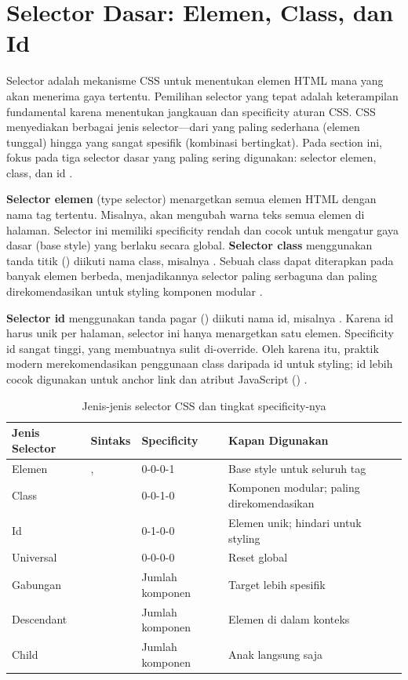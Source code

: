 \section{Selector Dasar: Elemen, Class, dan Id}

Selector adalah mekanisme CSS untuk menentukan elemen HTML mana yang akan menerima gaya tertentu. Pemilihan selector yang tepat adalah keterampilan fundamental karena menentukan jangkauan dan specificity aturan CSS. CSS menyediakan berbagai jenis selector---dari yang paling sederhana (elemen tunggal) hingga yang sangat spesifik (kombinasi bertingkat). Pada section ini, fokus pada tiga selector dasar yang paling sering digunakan: selector elemen, class, dan id \cite{mdnCss}.

\textbf{Selector elemen} (type selector) menargetkan semua elemen HTML dengan nama tag tertentu. Misalnya,  akan mengubah warna teks semua elemen  di halaman. Selector ini memiliki specificity rendah dan cocok untuk mengatur gaya dasar (base style) yang berlaku secara global. \textbf{Selector class} menggunakan tanda titik () diikuti nama class, misalnya . Sebuah class dapat diterapkan pada banyak elemen berbeda, menjadikannya selector paling serbaguna dan paling direkomendasikan untuk styling komponen modular \cite{webdevCss}.

\textbf{Selector id} menggunakan tanda pagar (\code{\#}) diikuti nama id, misalnya . Karena id harus unik per halaman, selector ini hanya menargetkan satu elemen. Specificity id sangat tinggi, yang membuatnya sulit di-override. Oleh karena itu, praktik modern merekomendasikan penggunaan class daripada id untuk styling; id lebih cocok digunakan untuk anchor link dan atribut JavaScript () \cite{cssTricks}.

\begin{table}[htbp]
\centering
\begin{tabular}{|P{2.5cm}|P{2.5cm}|P{3cm}|P{4cm}|}
\hline
\textbf{Jenis Selector} & \textbf{Sintaks} & \textbf{Specificity} & \textbf{Kapan Digunakan} \\
\hline
Elemen & ,  & 0-0-0-1 & Base style untuk seluruh tag \\
\hline
Class &  & 0-0-1-0 & Komponen modular; paling direkomendasikan \\
\hline
Id &  & 0-1-0-0 & Elemen unik; hindari untuk styling \\
\hline
Universal & \code{*} & 0-0-0-0 & Reset global \\
\hline
Gabungan &  & Jumlah komponen & Target lebih spesifik \\
\hline
Descendant &  & Jumlah komponen & Elemen di dalam konteks \\
\hline
Child &  & Jumlah komponen & Anak langsung saja \\
\hline
\end{tabular}
\caption{Jenis-jenis selector CSS dan tingkat specificity-nya}
\end{table}

